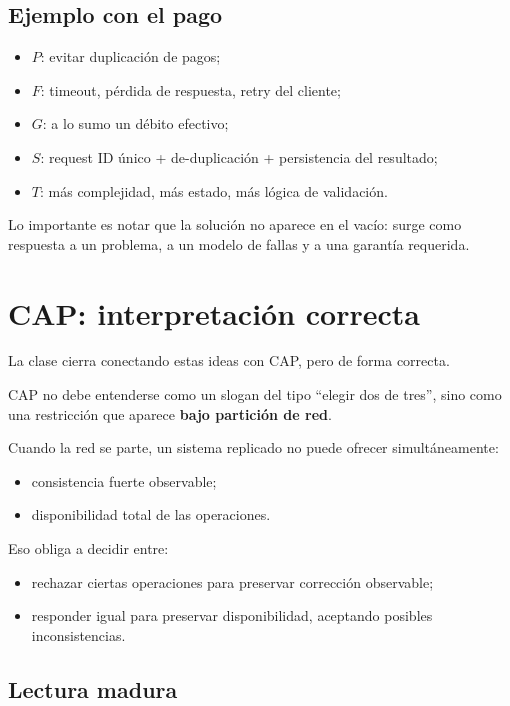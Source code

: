 \documentclass[variant=apuntes,cover=institutional,mode=screen]{ua-engineering-v6-article}
\begin{document}
\subsection{Ejemplo con el pago}\label{subsec:ejemplo-con-el-pago}

\begin{itemize}
\item $P$: evitar duplicación de pagos;
\item $F$: timeout, pérdida de respuesta, retry del cliente;
\item $G$: a lo sumo un débito efectivo;
\item $S$: request ID único + de-duplicación + persistencia del resultado;
\item $T$: más complejidad, más estado, más lógica de validación.
\end{itemize}

Lo importante es notar que la solución no aparece en el vacío: surge como respuesta a un problema, a un modelo de fallas y a una garantía requerida.

\section{CAP: interpretación correcta}\label{sec:cap:-interpretacion-correcta}

La clase cierra conectando estas ideas con CAP, pero de forma correcta.

CAP no debe entenderse como un slogan del tipo “elegir dos de tres”, sino como una restricción que aparece \textbf{bajo partición de red}.

Cuando la red se parte, un sistema replicado no puede ofrecer simultáneamente:

\begin{itemize}
\item consistencia fuerte observable;
\item disponibilidad total de las operaciones.
\end{itemize}

Eso obliga a decidir entre:

\begin{itemize}
\item rechazar ciertas operaciones para preservar corrección observable;
\item responder igual para preservar disponibilidad, aceptando posibles inconsistencias.
\end{itemize}

\subsection{Lectura madura}\label{subsec:lectura-madura}
\end{document}
